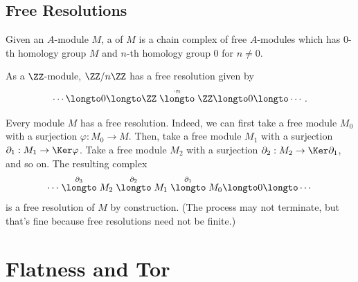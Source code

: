 \subsection{Free Resolutions}
\begin{definition}
    Given an $A$-module $M$, a  of $M$ is a chain complex of free $A$-modules which has $0$-th homology group $M$ and $n$-th homology group $0$ for $n\neq 0$.
\end{definition}
\begin{example}
    As a $\ZZ$-module, $\ZZ/n\ZZ$ has a free resolution given by \[\cdots \longto 0 \longto \ZZ \stackrel{\cdot n}\longto \ZZ \longto 0 \longto \cdots.\]
\end{example}
Every module $M$ has a free resolution. Indeed, we can first take a free module $M_0$ with a surjection $\varphi:M_0\to M$. Then, take a free module $M_1$ with a surjection $\partial_1: M_1\to \Ker \varphi$. Take a free module $M_2$ with a surjection $\partial_2:M_2\to \Ker \partial_1$, and so on. The resulting complex \[\cdots\stackrel{\partial_3}\longto M_2\stackrel{\partial_2}\longto M_1\stackrel{\partial_1}\longto M_0\longto 0\longto\cdots\] is a free resolution of $M$ by construction. (The process may not terminate, but that's fine because free resolutions need not be finite.)

\section{Flatness and Tor}
\label{sec:flatness_and_tor}
